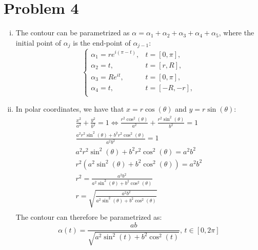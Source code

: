 \documentclass[a4paper, titlepage, DIV=14]{scrartcl}
\begin{document}
    \section*{Problem 4}
    \begin{enumerate}[(i)]
        \item The contour can be parametrized as $\alpha = \alpha_{1} + \alpha_{2} + \alpha_{3} + \alpha_{4}
        + \alpha_{5}$, where the initial point of $\alpha_{j}$ is the end-point of $\alpha_{j-1}$:
        \[
          \begin{cases}
              \alpha_{1} = re^{i(\pi-t)}, & t = [0, \pi], \\
              \alpha_{2} = t, & t = [r, R], \\
              \alpha_{3} = Re^{it}, & t = [0, \pi], \\
              \alpha_{4} = t, & t = [-R,-r], \\
          \end{cases}  
        \]

        \item In polar coordinates, we have that $x=r\cos(\theta)$ and $y=r\sin(\theta)$:
        \begin{gather*}
            \frac{x^{2}}{a^{2}} + \frac{y^{2}}{b^{2}} = 1 
                \Leftrightarrow \frac{r^{2}\cos^{2}(\theta)}{a^{2}} + 
                    \frac{r^{2}\sin^{2}(\theta)}{b^{2}} = 1 \\
                \frac{a^{2}r^{2}\sin^{2}(\theta) + b^{2}r^{2}\cos^{2}(\theta)}{a^{2}b^{2}} = 1 \\
                a^{2}r^{2}\sin^{2}(\theta) + b^{2}r^{2}\cos^{2}(\theta) = a^{2}b^{2} \\
                r^{2}(a^{2}\sin^{2}(\theta) + b^{2}\cos^{2}(\theta)) = a^{2}b^{2} \\
                r^{2} = \frac{a^{2}b^{2}}{a^{2}\sin^{2}(\theta) + b^{2}\cos^{2}(\theta)} \\
                r = \sqrt{\frac{a^{2}b^{2}}{a^{2}\sin^{2}(\theta) + b^{2}\cos^{2}(\theta)}} \\
        \end{gather*}
        The contour can therefore be parametrized as:
        \begin{equation*}
            \alpha(t) = \frac{ab}{\sqrt{a^{2}\sin^{2}(t) + b^{2}\cos^{2}(t)}}, \, t\in[0,2\pi]
        \end{equation*}
    \end{enumerate}
\end{document}
